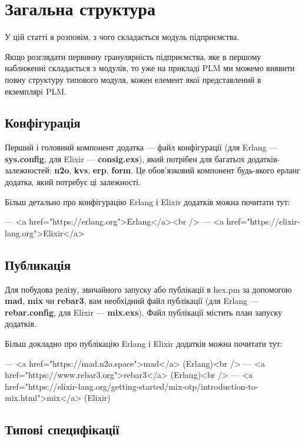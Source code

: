 \chapter{Загальна структура}

        У цій статті я розповім, з чого складається модуль підприємства.

        Якщо розглядати первинну гранулярність підприємства, яке
           в першому наближенні складається з модулів, то уже на прикладі PLM
           ми можемо виявити повну структуру типового модуля, кожен елемент
           якої представлений в екземплярі PLM.

        \section{Конфігурація}

        Перший і головний компонент додатка — файл конфігурації
           (для Erlang — \textbf{sys.config}, для Elixir — \textbf{consig.exs}),
           який потрібен для багатьох додатків-залежностей:
           \textbf{n2o}, \textbf{kvs}, \textbf{erp}, \textbf{form}.
           Це обов'язковий компонент будь-якого ерланг додатка, який
           потребує ці залежності.

        Більш детально про конфігурацію Erlang і Elixir додатків можна почитати тут:

        — <a href="https://erlang.org">Erlang</a><br />
           — <a href="https://elixir-lang.org">Elixir</a>

        \section{Публикація}

        Для побудова релізу, звичайного запуску або публікації в hex.pm
           за допомогою \textbf{mad}, \textbf{mix} чи \textbf{rebar3},
           вам необхідний файл публікації (для Erlang — \textbf{rebar.config},
           для Elixir — \textbf{mix.exs}). Файл публікації містить план запуску додатків.

        Більш докладно про публікацію Erlang і Elixir додатків можна почитати тут:

        — <a href="https://mad.n2o.space">mad</a> (Erlang)<br />
           — <a href="https://www.rebar3.org">rebar3</a> (Erlang)<br />
           — <a href="https://elixir-lang.org/getting-started/mix-otp/introduction-to-mix.html">mix</a> (Elixir)

        \section{Типові специфікації}

